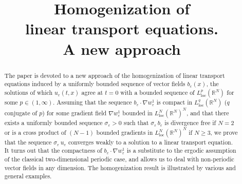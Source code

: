 \documentclass[JEP,XML,SOM,Unicode]{cedram}
\theoremstyle{plain}
\theoremstyle{definition}
\begin{document}
\frontmatter
\title[Homogenization of linear transport equations. A new approach]{Homogenization of\\ linear transport equations.\\ A new approach}

\author[\initial{M.} \lastname{Briane}]{ }
\address{Univ Rennes, INSA Rennes, CNRS, IRMAR - UMR 6625\\
F-35000 Rennes, France}

\begin{abstract}
The paper is devoted to a new approach of the homogenization of linear transport equations induced by a uniformly bounded sequence of vector fields $b_\varepsilon(x)$, the solutions of which $u_\varepsilon(t,x)$ agree at $t=0$ with a bounded sequence of $L^p_\mathrm{loc}(\mathbb{R}^N)$ for some $p\in(1,\infty)$. Assuming that the sequence $b_\varepsilon\cdot\nabla w_\varepsilon^1$ is compact in $L^q_\mathrm{loc}(\mathbb{R}^N)$ ($q$ conjugate of $p$) for some gradient field $\nabla w_\varepsilon^1$ bounded in $L^N_\mathrm{loc}(\mathbb{R}^N)^N$, and that there exists a uniformly bounded sequence $\sigma_\varepsilon>0$ such that $\sigma_\varepsilon\,b_\varepsilon$ is divergence free if $N\!=\!2$ or is a cross product of $(N\!-\!1)$ bounded gradients in $L^N_\mathrm{loc}(\mathbb{R}^N)^N$ if $N\!\geq\!3$, we prove that the sequence $\sigma_\varepsilon\,u_\varepsilon$ converges weakly to a solution to a linear transport equation. It turns out that the compactness of $b_\varepsilon\cdot\nabla w_\varepsilon^1$ is a substitute to the ergodic assumption of the classical two-dimensional periodic case, and allows us to deal with non-periodic vector fields in any dimension. The homogenization result is illustrated by various and general examples.
\end{abstract}



\end{document}
